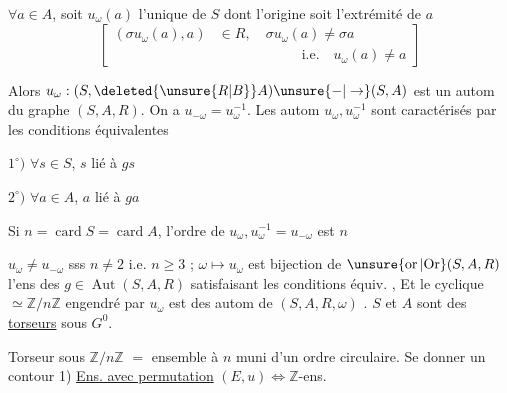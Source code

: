 $\forall a\in A$, soit $u_{\omega}(a)$ l'unique  de $S$ dont l'origine soit l'extrémité de $a$
\[
\left[\begin{aligned}
(\sigma u_{\omega}(a),a)&\in R,\quad \sigma u_{\omega}(a)\ne\sigma a\\
&\hspace{6em}\text{i.e.}\quad u_{\omega}(a)\ne a
\end{aligned}\right]
\]

\margin{$\big\}$}Alors $u_{\omega}:(S,\deleted{\unsure{R|B}}A)\unsure{-|\to}(S,A)$ est un autom du graphe $(S,A,R)$. On a $u_{-\omega}=u_{\omega}^{-1}$. Les autom $u_{\omega},u_{\omega}^{-1}$ sont caractérisés par les  conditions équivalentes

$1^{\circ})$ $\forall s\in S$, $s$ lié à $gs$

$2^{\circ})$ $\forall a\in A$, $a$ lié à $ga$

Si $n=\operatorname{card}S=\operatorname{card}A$, l'ordre de $u_{\omega},u_{\omega}^{-1}=u_{-\omega}$ est $n$

 $u_{\omega}\ne u_{-\omega}$ sss $n\ne2$ i.e. $n\geq3$ ;  $\omega\longmapsto u_{\omega}$ est bijection de $\unsure{\operatorname{or}|{\rm Or}}(S,A,R)$  l'ens des $g\in\operatorname{Aut}(S,A,R)$ satisfaisant les conditions équiv. , Et le  cyclique $\simeq\mathbb{Z}/n\mathbb{Z}$ engendré par $u_{\omega}$ est    des autom  de $(S,A,R,\omega)$ . $S$ et $A$ sont des \uline{torseurs} sous $G^{0}$.


Torseur sous $\mathbb{Z}/n\mathbb{Z}$  $=$ ensemble  à $n$  muni d'un ordre \unsure{$^{\times}$|$^{*}$} circulaire. Se donner un contour
1) \uline{Ens. avec permutation} $(E,u)\Longleftrightarrow\mathbb{Z}$-ens.

